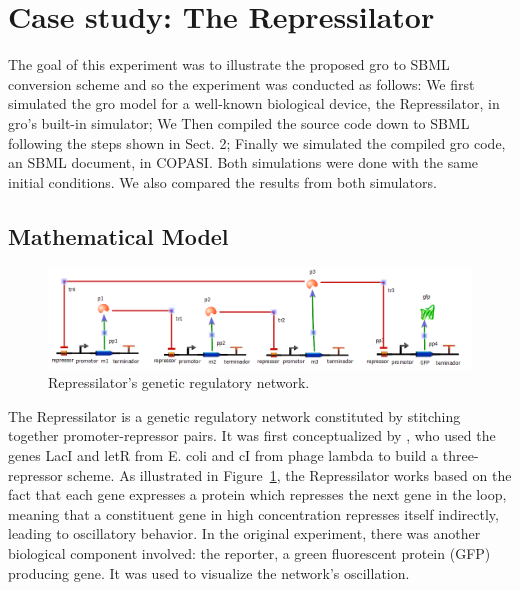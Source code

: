 \documentclass[12pt]{article}
\begin{document}
\section{Case study: The Repressilator}


    The goal of this experiment was to illustrate the proposed gro to SBML conversion scheme and so the experiment was conducted as follows: We first simulated the gro model for a well-known biological device, the Repressilator, in gro's built-in simulator; We Then compiled the source code down to SBML following the steps shown in Sect. 2; Finally we simulated the compiled gro code, an SBML document, in COPASI. Both simulations were done with the same initial conditions. We also compared the results from both simulators.


\subsection{Mathematical Model}

    \begin{figure}[h]
        \centering
        \includegraphics[scale = 0.7]{repressilator_model.png}
        \caption{Repressilator's genetic regulatory network.}
        \label{fig:repressilator_model}
    \end{figure}
    
    The Repressilator is a genetic regulatory network constituted by stitching together promoter-repressor pairs. It was first conceptualized by \cite{Elowitz2000}, who used the genes LacI and letR from E. coli and cI from phage lambda to build a three-repressor scheme. As illustrated in Figure~\ref{fig:repressilator_model}, the Repressilator works based on the fact that each gene expresses a protein which represses the next gene in the loop, meaning that a constituent gene in high concentration represses itself indirectly, leading to oscillatory behavior. In the original experiment, there was another biological component involved: the reporter, a green fluorescent protein (GFP) producing gene. It was used to visualize the network's oscillation.
    
\end{document}
